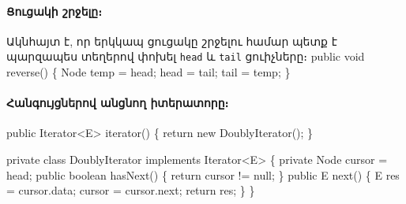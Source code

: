 %
%
\paragraph{Ցուցակի շրջելը։}
Ակնհայտ է, որ երկկապ ցուցակը շրջելու համար պետք է 
պարզապես տեղերով փոխել \texttt{head} և \texttt{tail}
ցուիչները։
\nwenddocs{}\endmoddef{}
public void reverse()
\{
  Node temp = head;
  head = tail;
  tail = temp;
\}
\nwendcode{}\nwdocspar

%
%
\paragraph{Հանգույցներով անցնող իտերատորը։}
\nwenddocs{}\endmoddef{}
public Iterator<E> iterator()
\{
  return new DoublyIterator();
\}

private class DoublyIterator
    implements Iterator<E> \{
  private Node cursor = head;
  public boolean hasNext()
  \{
    return cursor != null;
  \}
  public E next()
  \{
    E res = cursor.data;
    cursor = cursor.next;
    return res;
  \}
\}
\nwendcode{}

